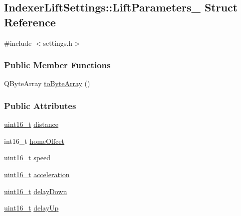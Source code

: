 \hypertarget{structIndexerLiftSettings_1_1LiftParameters__}{}\subsection{Indexer\+Lift\+Settings\+:\+:Lift\+Parameters\+\_\+ Struct Reference}
\label{structIndexerLiftSettings_1_1LiftParameters__}


{\ttfamily \#include $<$settings.\+h$>$}

\subsubsection*{Public Member Functions}
\begin{DoxyCompactItemize}
\item 
Q\+Byte\+Array \mbox{\hyperlink{structIndexerLiftSettings_1_1LiftParameters___a3ebd27254d4e8fd93bf9c232b91ce02b}{to\+Byte\+Array}} ()
\end{DoxyCompactItemize}
\subsubsection*{Public Attributes}
\begin{DoxyCompactItemize}
\item 
\mbox{\hyperlink{settings_8h_a017dd44e68049ffdd31500a8cd01ba68}{uint16\+\_\+t}} \mbox{\hyperlink{structIndexerLiftSettings_1_1LiftParameters___a06b8577e99fa65540f7a3fce65f1b636}{distance}}
\item 
int16\+\_\+t \mbox{\hyperlink{structIndexerLiftSettings_1_1LiftParameters___a4800b01f06aeea46b05410cd02f65782}{home\+Offcet}}
\item 
\mbox{\hyperlink{settings_8h_a017dd44e68049ffdd31500a8cd01ba68}{uint16\+\_\+t}} \mbox{\hyperlink{structIndexerLiftSettings_1_1LiftParameters___a72a2b1c4a0ca54f795b5b85b931c2110}{speed}}
\item 
\mbox{\hyperlink{settings_8h_a017dd44e68049ffdd31500a8cd01ba68}{uint16\+\_\+t}} \mbox{\hyperlink{structIndexerLiftSettings_1_1LiftParameters___aba1e89619b980dc52a4cf3878a13399a}{acceleration}}
\item 
\mbox{\hyperlink{settings_8h_a017dd44e68049ffdd31500a8cd01ba68}{uint16\+\_\+t}} \mbox{\hyperlink{structIndexerLiftSettings_1_1LiftParameters___aba00ed0d4dccb1defbcd05ee9ddf4a5a}{delay\+Down}}
\item 
\mbox{\hyperlink{settings_8h_a017dd44e68049ffdd31500a8cd01ba68}{uint16\+\_\+t}} \mbox{\hyperlink{structIndexerLiftSettings_1_1LiftParameters___ab31c06ea526a1af433c95e7d1635414c}{delay\+Up}}
\end{DoxyCompactItemize}


